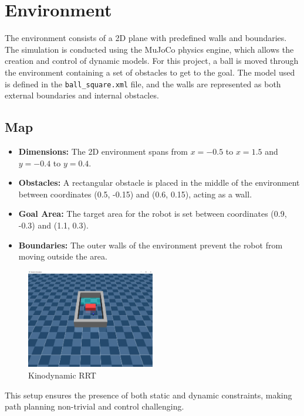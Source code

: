 \documentclass[12pt]{article}
\begin{document}
\section{Environment}
The environment consists of a 2D plane with predefined walls and boundaries. The simulation is conducted using the MuJoCo physics engine, which allows the creation and control of dynamic models. For this project, a ball is moved through the environment containing a set of obstacles to get to the goal. The model used is defined in the \texttt{ball\_square.xml} file, and the walls are represented as both external boundaries and internal obstacles.

\subsection{Map}
\begin{itemize}
    \item \textbf{Dimensions:} The 2D environment spans from $x = -0.5$ to $x = 1.5$ and $y = -0.4$ to $y = 0.4$.
    \item \textbf{Obstacles:} A rectangular obstacle is placed in the middle of the environment between coordinates (0.5, -0.15) and (0.6, 0.15), acting as a wall.
    \item \textbf{Goal Area:} The target area for the robot is set between coordinates (0.9, -0.3) and (1.1, 0.3).
    \item \textbf{Boundaries:} The outer walls of the environment prevent the robot from moving outside the area.
\end{itemize}

    \begin{figure}[h]
    \centering
      \includegraphics[width=0.5\textwidth]{./images/render.png}
      \caption{Kinodynamic RRT}
      \label{fig:sample_image}
    \end{figure}

This setup ensures the presence of both static and dynamic constraints, making path planning non-trivial and control challenging.
\end{document}
